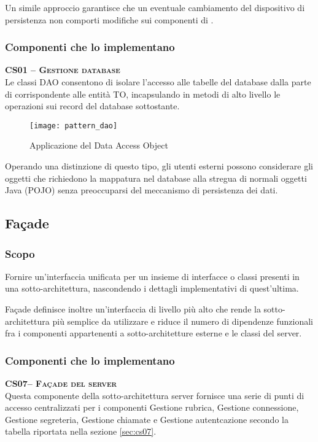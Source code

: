 Un simile approccio garantisce che un eventuale cambiamento del dispositivo di persistenza non comporti modifiche sui componenti di .

\subsubsection{Componenti che lo implementano}
\begin{description}
\item{\scshape\bfseries CS01 -- Gestione database}\\
Le classi DAO consentono di isolare l'accesso alle tabelle del database dalla parte di  corrispondente alle entità TO, incapsulando in metodi di alto livello le operazioni sui record del database sottostante.

\begin{figure}[H]
  \centering
  \texttt{[image: pattern\_dao]}
  \caption{Applicazione del  Data Access Object}\label{fig:dao}
\end{figure}

Operando una distinzione di questo tipo, gli utenti esterni possono considerare gli oggetti che richiedono la mappatura nel database alla stregua di normali oggetti Java (POJO) senza preoccuparsi del meccanismo di persistenza dei dati.
\end{description}

\subsection{Façade}\label{sec:patternfacade}

\subsubsection{Scopo}
Fornire un'interfaccia unificata per un insieme di interfacce o classi presenti in una sotto-architettura, nascondendo i dettagli implementativi di quest'ultima.

Façade definisce inoltre un'interfaccia di livello più alto che rende la sotto-architettura più semplice da utilizzare e riduce il numero di dipendenze funzionali fra i componenti appartenenti a sotto-architetture esterne e le classi del server.

\subsubsection{Componenti che lo implementano}
\begin{description}
  \item{\scshape\bfseries CS07-- Façade del server}\\
Questa componente della sotto-architettura server fornisce una serie di punti di accesso centralizzati per i componenti \textsf{Gestione rubrica}, \textsf{Gestione connessione}, \textsf{Gestione segreteria}, \textsf{Gestione chiamate} e \textsf{Gestione autentcazione} secondo la tabella riportata nella sezione \vref{sec:cs07}.
\end{description}

